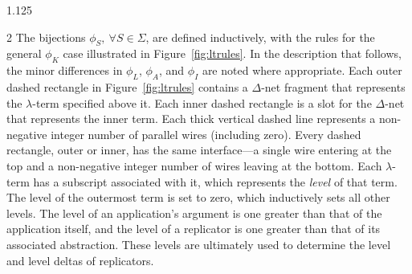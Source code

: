 \documentclass[10pt]{article}
\newcommand{\fan}[4]{
  \begin{scope}[shift={(#2)}, yscale={#3}]
    \coordinate (#1-left) at (-0.7,0.4);
    \coordinate (#1-right) at (0.7,0.4);
    \coordinate (#1-tip) at (0,-0.8);
    \ifthenelse{\equal{#4}{true}}{
      \draw[line width=1.4pt]  (-1,0.4) -- (1,0.4) -- (0,-0.8) -- cycle;
    }{false};
  \end{scope}
}
\newcommand{\eraser}[4]{
  \begin{scope}[shift={(#2)}, yscale={#3}]
    \def\r{0.3}
    \def\diag{1.41421356237*\r/2}
    \coordinate (#1-tip) at (0,-\r);
    \ifthenelse{\equal{#4}{true}}{
      \draw[line width=1.4pt] (0,0) circle (\r);
      \draw[line width=1.4pt] (\diag,\diag) --  (-\diag,-\diag);
      \draw[line width=1.4pt] (\diag,-\diag) --  (-\diag,\diag);
    }{false};
  \end{scope}
}
\begin{document}
\begin{spacing}{1.125}
\begin{multicols}{2}
The bijections $\phi_S,\ \forall S \in \Sigma$, are defined inductively, with the rules for the general $\phi_K$ case illustrated in \mbox{Figure \ref{fig:ltrules}}.
In the description that follows, the minor differences in \mbox{$\phi_L$}, \mbox{$\phi_A$}, and \mbox{$\phi_I$} are noted where appropriate.
Each outer dashed rectangle in \mbox{Figure \ref{fig:ltrules}} contains a \mbox{$\Delta$-net} fragment that represents the \mbox{$\lambda$-term} specified above it.
Each inner dashed rectangle is a slot for the \mbox{$\Delta$-net} that represents the inner term.
Each thick vertical dashed line represents a non-negative integer number of parallel wires (including zero). Every dashed rectangle, outer or inner, has the same interface---a single wire entering at the top and a non-negative integer number of wires leaving at the bottom.
Each \mbox{$\lambda$-term} has a subscript associated with it, which represents the \textit{level} of that term.
The level of the outermost term is set to zero, which inductively sets all other levels. The level of an application's argument is one greater than that of the application itself, and the level of a replicator is one greater than that of its associated abstraction.
These levels are ultimately used to determine the level and level deltas of replicators.

\begin{figure}[H]
  \centering
\end{figure}
\end{multicols}
\end{spacing}
\end{document}
